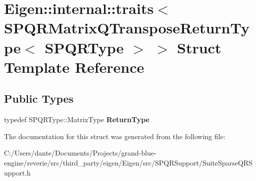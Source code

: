 \hypertarget{struct_eigen_1_1internal_1_1traits_3_01_s_p_q_r_matrix_q_transpose_return_type_3_01_s_p_q_r_type_01_4_01_4}{}\section{Eigen\+::internal\+::traits$<$ S\+P\+Q\+R\+Matrix\+Q\+Transpose\+Return\+Type$<$ S\+P\+Q\+R\+Type $>$ $>$ Struct Template Reference}
\label{struct_eigen_1_1internal_1_1traits_3_01_s_p_q_r_matrix_q_transpose_return_type_3_01_s_p_q_r_type_01_4_01_4}
\subsection*{Public Types}
\begin{DoxyCompactItemize}
\item 
\mbox{\label{struct_eigen_1_1internal_1_1traits_3_01_s_p_q_r_matrix_q_transpose_return_type_3_01_s_p_q_r_type_01_4_01_4_a0bcc1fcd4467fd942ce61a11c5167ea2}} 
typedef S\+P\+Q\+R\+Type\+::\+Matrix\+Type {\bfseries Return\+Type}
\end{DoxyCompactItemize}


The documentation for this struct was generated from the following file\+:\begin{DoxyCompactItemize}
\item 
C\+:/\+Users/dante/\+Documents/\+Projects/grand-\/blue-\/engine/reverie/src/third\+\_\+party/eigen/\+Eigen/src/\+S\+P\+Q\+R\+Support/Suite\+Sparse\+Q\+R\+Support.\+h\end{DoxyCompactItemize}
